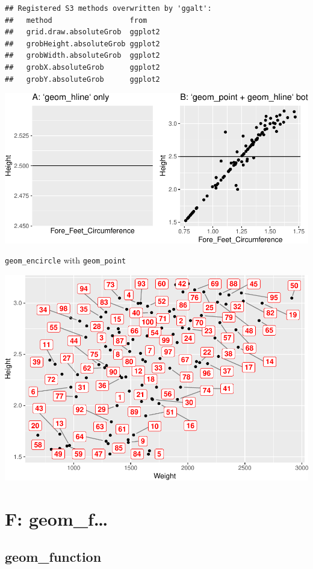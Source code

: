 \documentclass[
]{book}
\begin{document}
\begin{verbatim}
## Registered S3 methods overwritten by 'ggalt':
##   method                  from   
##   grid.draw.absoluteGrob  ggplot2
##   grobHeight.absoluteGrob ggplot2
##   grobWidth.absoluteGrob  ggplot2
##   grobX.absoluteGrob      ggplot2
##   grobY.absoluteGrob      ggplot2
\end{verbatim}

\includegraphics{Data-Visualisation-geom-Encyclopedia_files/figure-latex/unnamed-chunk-40-1.pdf}

\texttt{geom\_encircle} with \texttt{geom\_point}

\includegraphics{Data-Visualisation-geom-Encyclopedia_files/figure-latex/unnamed-chunk-41-1.pdf}

\hypertarget{f-geom_f}{%
\chapter{F: geom\_f\ldots{}}\label{f-geom_f}}

\hypertarget{geom_function}{%
\section{geom\_function}\label{geom_function}}
\end{document}
